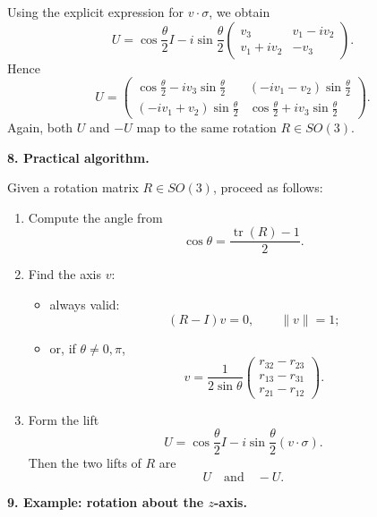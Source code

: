 \documentclass[12pt,a4paper]{article}
\theoremstyle{notespace}
\begin{document}
Using the explicit expression for \(v\cdot \sigma\), we obtain
\[
U=
\cos\frac{\theta}{2}I
-
i\sin\frac{\theta}{2}
\begin{pmatrix}
	v_3 & v_1-i v_2\\
	v_1+i v_2 & -v_3
\end{pmatrix}.
\]
Hence
\[
\boxed{
	U=
	\begin{pmatrix}
		\cos\frac{\theta}{2}-i v_3\sin\frac{\theta}{2}
		&
		(-i v_1-v_2)\sin\frac{\theta}{2}
		\\[6pt]
		(-i v_1+v_2)\sin\frac{\theta}{2}
		&
		\cos\frac{\theta}{2}+i v_3\sin\frac{\theta}{2}
	\end{pmatrix}.
}
\]
Again, both \(U\) and \(-U\) map to the same rotation \(R\in SO(3)\).

\medskip

\textbf{8. Practical algorithm.}

Given a rotation matrix \(R\in SO(3)\), proceed as follows:

\begin{enumerate}
	\item Compute the angle from
	\[
	\cos\theta=\frac{\operatorname{tr}(R)-1}{2}.
	\]
	
	\item Find the axis \(v\):
	\begin{itemize}
		\item always valid:
		\[
		(R-I)v=0,
		\qquad
		\|v\|=1;
		\]
		\item or, if \(\theta\neq 0,\pi\),
		\[
		v=
		\frac{1}{2\sin\theta}
		\begin{pmatrix}
			r_{32}-r_{23}\\
			r_{13}-r_{31}\\
			r_{21}-r_{12}
		\end{pmatrix}.
		\]
	\end{itemize}
	
	\item Form the lift
	\[
	U=\cos\frac{\theta}{2}I-i\sin\frac{\theta}{2}(v\cdot \sigma).
	\]
	Then the two lifts of \(R\) are
	\[
	\boxed{U\quad\text{and}\quad -U.}
	\]
\end{enumerate}

\medskip

\textbf{9. Example: rotation about the \(z\)-axis.}
\end{document}
